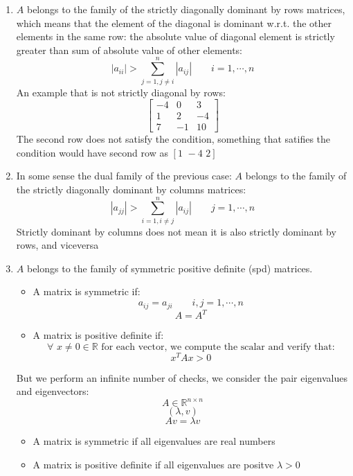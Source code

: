 \begin{itemize}
    \begin{enumerate}[1)]
        \item $A$ belongs to the family of the strictly diagonally dominant by rows matrices, which means that the element of the diagonal is dominant w.r.t. the other elements in the same row: the absolute value of diagonal element is strictly greater than sum of absolute value of other elements:
        $$
        |a_{ii}|>\sum_{j=1,j\neq i}^n |a_{ij}|\qquad i=1,\cdots,n
        $$
        An example that is not strictly diagonal by rows:
        $$
        \begin{bmatrix}
            -4 & 0 & 3\\
            1 & 2 & -4\\
            7 & -1 & 10
        \end{bmatrix}
        $$
        The second row does not satisfy the condition, something that satifies the condition would have second row as $[1\,\,-4\,\,2]$
        \item In some sense the dual family of the previous case: $A$ belongs to the family of the strictly diagonally dominant by columns matrices:
        $$
        |a_{jj}|>\sum_{i=1,i\neq j}^n |a_{ij}|\qquad j=1,\cdots,n
        $$
        Strictly dominant by columns does not mean it is also strictly dominant by rows, and viceversa
        \item $A$ belongs to the family of symmetric positive definite (spd) matrices.
        \begin{itemize}
            \item A matrix is symmetric if:
            $$
            a_{ij}=a_{ji}\qquad i,j=1,\cdots,n
            $$
            $$
            A=A^T
            $$
            \item A matrix is positive definite if:
            $$
            \forall\,\,x\neq 0\in\mathbb{R}\text{ for each vector, we compute the scalar and verify that:}
            $$
            $$
            x^TAx>0
            $$
        \end{itemize}
        But we perform an infinite number of checks, we consider the pair eigenvalues and eigenvectors:
        $$
        A\in\mathbb{R}^{n\times n}
        $$
        $$
        (\lambda,v)
        $$
        $$
        Av=\lambda v
        $$
        \begin{itemize}
            \item A matrix is symmetric if all eigenvalues are real numbers
            \item A matrix is positive definite if all eigenvalues are positve $\lambda >0$
        \end{itemize}
    \end{enumerate}
\end{itemize}


